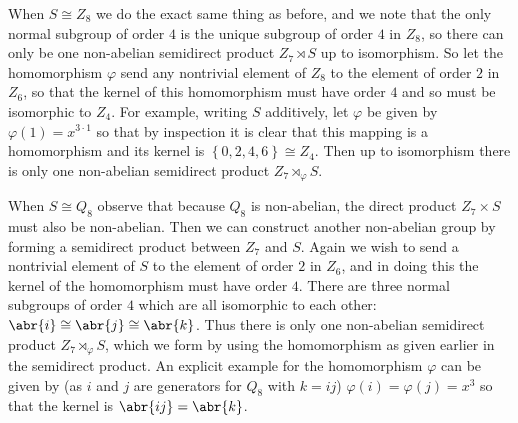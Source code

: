 \documentclass[11pt]{article}
\newcommand{\cbr}[1]{\left\{#1\right\}}
\begin{document}
\begin{enumerate}
\begin{enumerate}[label=\textbf{(\alph*)}]
        When $S\cong Z_8$ we do the exact same thing as before, and we note that the only normal subgroup of order $4$ is the unique subgroup of order $4$ in $Z_8$, so there can only be one non-abelian semidirect product $Z_7\rtimes S$ up to isomorphism. So let the homomorphism $\varphi$ send any nontrivial element of $Z_8$ to the element of order $2$ in $Z_6$, so that the kernel of this homomorphism must have order $4$ and so must be isomorphic to $Z_4$. For example, writing $S$ additively, let $\varphi$ be given by $\varphi(1) = x^{3\cdot 1}$ so that by inspection it is clear that this mapping is a homomorphism and its kernel is $\cbr{0,2,4,6}\cong Z_4$. Then up to isomorphism there is only one non-abelian semidirect product $Z_7\rtimes_{\varphi} S$.

        When $S\cong Q_8$ observe that because $Q_8$ is non-abelian, the direct product $Z_7\times S$ must also be non-abelian. Then we can construct another non-abelian group by forming a semidirect product between $Z_7$ and $S$. Again we wish to send a nontrivial element of $S$ to the element of order $2$ in $Z_6$, and in doing this the kernel of the homomorphism must have order $4$. There are three normal subgroups of order $4$ which are all isomorphic to each other: $\abr{i}\cong \abr{j} \cong \abr{k}$. Thus there is only one non-abelian semidirect product $Z_7\rtimes_{\varphi} S$, which we form by using the homomorphism as given earlier in the semidirect product. An explicit example for the homomorphism $\varphi$ can be given by (as $i$ and $j$ are generators for $Q_8$ with $k = ij$) $\varphi(i) = \varphi(j) = x^3$ so that the kernel is $\abr{ij} = \abr{k}$.


\end{enumerate}
\end{enumerate}
\end{document}
